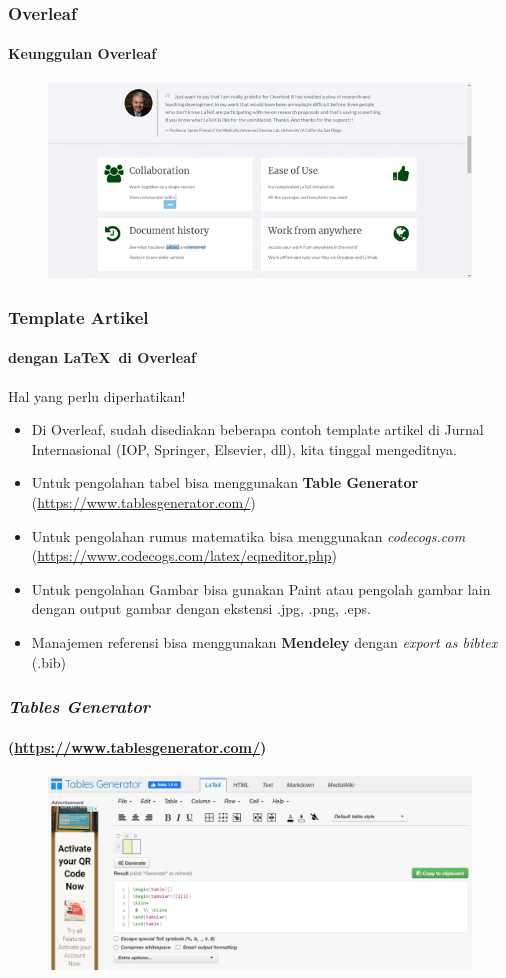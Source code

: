 \documentclass[aspectratio=169]{beamer}
\begin{document}
\begin{frame}
\frametitle{\textbf{Overleaf}}
\framesubtitle{Keunggulan Overleaf}
\begin{figure}
    \centering
    \includegraphics[width=\textwidth]{gambar/overleaf-2.png}
\end{figure}
\end{frame}

\begin{frame}
\frametitle{Template Artikel}
\framesubtitle{dengan \LaTeX\ di Overleaf}
Hal yang perlu diperhatikan!
\begin{itemize}
    \item Di Overleaf, sudah disediakan beberapa contoh template artikel di Jurnal Internasional (IOP, Springer, Elsevier, dll), kita tinggal mengeditnya.
    \item Untuk pengolahan tabel bisa menggunakan \textbf{Table Generator} (\url{https://www.tablesgenerator.com/})
    \item Untuk pengolahan rumus matematika bisa menggunakan \textit{codecogs.com} (\url{https://www.codecogs.com/latex/eqneditor.php})
    \item Untuk pengolahan Gambar bisa gunakan Paint atau pengolah gambar lain dengan output gambar dengan ekstensi .jpg, .png, .eps.
    \item Manajemen referensi bisa menggunakan \textbf{Mendeley} dengan \textit{export as bibtex} (.bib)
\end{itemize}
\end{frame}

\begin{frame}
\frametitle{\textit{Tables Generator}}
\framesubtitle{(\url{https://www.tablesgenerator.com/})}
\begin{figure}
    \centering
    \includegraphics[width=\textwidth]{gambar/tablegen.png}
\end{figure}
\end{frame}
\end{document}
